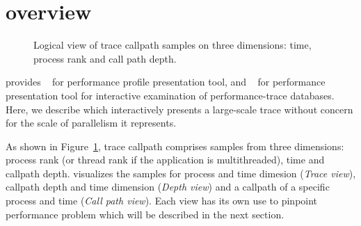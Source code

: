 


\newcommand{\traceview}{Trace view}
\newcommand{\depthview}{Depth view}
\newcommand{\miniview}{Mini map view}
\newcommand{\callview}{Call path view}



\section{\hpctraceviewer{} overview}

\begin{figure}[t]
\caption{Logical view of trace callpath samples on three dimensions: time, process rank and call path depth.}
\label{fig:hpctraceviewer-callpath}
\end{figure}

\HPCToolkit{} provides \hpcviewer{}~\cite{Adhianto-MC-Ta:2010:PSTI-hpcviewer} for performance profile presentation tool, and \hpctraceviewer{}~\cite{Tallent-MC-etal:2011:hpctoolkit-scalable-tracing} for performance presentation tool for interactive examination of performance-trace databases.
Here, we describe \hpctraceviewer{} which interactively presents a large-scale trace without concern for the scale of parallelism it represents.

As shown in Figure~\ref{fig:hpctraceviewer-callpath}, trace callpath comprises samples from three dimensions: process rank (or thread rank if the application is multithreaded), time and callpath depth.
\hpctraceviewer{} visualizes the samples for process and time dimesion (\emph{\traceview}), callpath depth and time dimension (\emph{\depthview}) and a callpath of a specific process and time (\emph{\callview}).
Each view has its own use to pinpoint performance problem which will be described in the next section.

